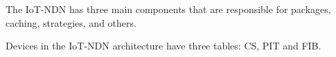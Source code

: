 \documentclass[conference]{IEEEtran}
\begin{document}
  The IoT-NDN has three main components that are responsible for packages, caching, strategies, 
  and others.
  
  
  Devices in the IoT-NDN architecture have three tables: CS, PIT and FIB.
  
  
  
  
  
  
\end{document}
